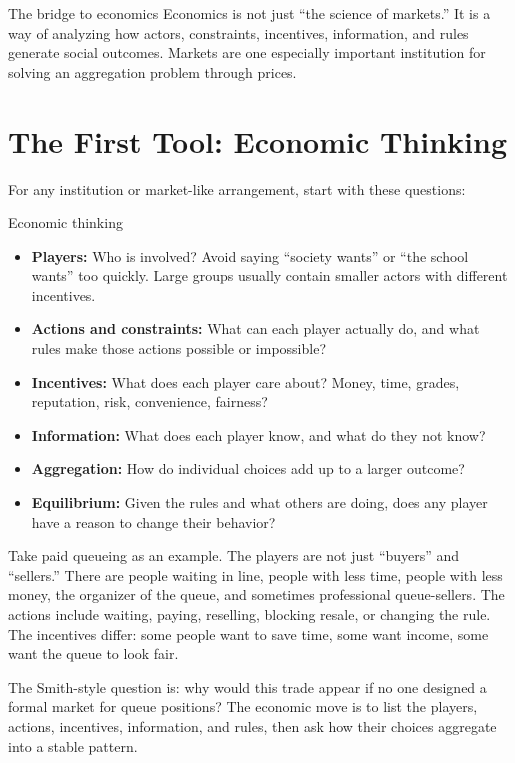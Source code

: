 \documentclass[10pt,a4paper]{article}
\begin{document}
\begin{insightbox}{The bridge to economics}
Economics is not just ``the science of markets.'' It is a way of analyzing how actors, constraints, incentives, information, and rules generate social outcomes. Markets are one especially important institution for solving an aggregation problem through prices.
\end{insightbox}

\section{The First Tool: Economic Thinking}

For any institution or market-like arrangement, start with these questions:

\begin{conceptbox}{Economic thinking}
\begin{itemize}
  \item \textbf{Players:} Who is involved? Avoid saying ``society wants'' or ``the school wants'' too quickly. Large groups usually contain smaller actors with different incentives.
  \item \textbf{Actions and constraints:} What can each player actually do, and what rules make those actions possible or impossible?
  \item \textbf{Incentives:} What does each player care about? Money, time, grades, reputation, risk, convenience, fairness?
  \item \textbf{Information:} What does each player know, and what do they not know?
  \item \textbf{Aggregation:} How do individual choices add up to a larger outcome?
  \item \textbf{Equilibrium:} Given the rules and what others are doing, does any player have a reason to change their behavior?
\end{itemize}
\end{conceptbox}

Take paid queueing as an example. The players are not just ``buyers'' and ``sellers.'' There are people waiting in line, people with less time, people with less money, the organizer of the queue, and sometimes professional queue-sellers. The actions include waiting, paying, reselling, blocking resale, or changing the rule. The incentives differ: some people want to save time, some want income, some want the queue to look fair.

The Smith-style question is: why would this trade appear if no one designed a formal market for queue positions? The economic move is to list the players, actions, incentives, information, and rules, then ask how their choices aggregate into a stable pattern.
\end{document}
